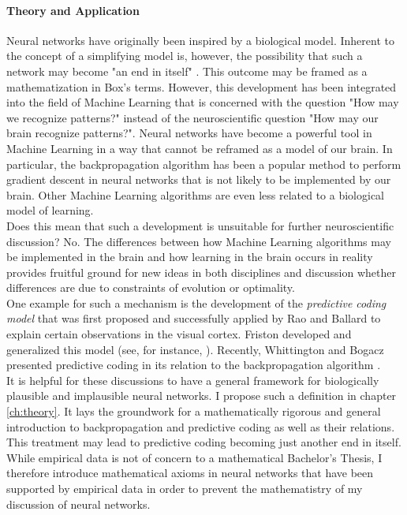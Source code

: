 \documentclass[a4paper,11pt]{report}
\begin{document}
\paragraph{Theory and Application}
Neural networks have originally been inspired by a biological model. Inherent to the concept of a simplifying model is, however, the possibility that such a network may become "an end in itself" \cite[][1305]{Sejnowski1988}. This outcome may be framed as a mathematization in Box's terms. However, this development has been integrated into the field of Machine Learning that is concerned with the question "How may we recognize patterns?" instead of the neuroscientific question "How may our brain recognize patterns?". Neural networks have become a powerful tool in Machine Learning in a way that cannot be reframed as a model of our brain. In particular, the backpropagation algorithm has been a popular method to perform gradient descent in neural networks that is not likely to be implemented by our brain. \cite{Liao2015} Other Machine Learning algorithms are even less related to a biological model of learning.\\
Does this mean that such a development is unsuitable for further neuroscientific discussion? No. The differences between how Machine Learning algorithms may be implemented in the brain and how learning in the brain occurs in reality provides fruitful ground for new ideas in both disciplines and discussion whether differences are due to constraints of evolution or optimality.\\
One example for such a mechanism is the development of the \emph{predictive coding model} that was first proposed and successfully applied by Rao and Ballard \cite{Rao1999} to explain certain observations in the visual cortex. Friston developed and generalized this model (see, for instance, \cite{Friston2005}). Recently, Whittington and Bogacz presented predictive coding in its relation to the backpropagation algorithm \cite{Whittington2017}.\\
It is helpful for these discussions to have a general framework for biologically plausible and implausible neural networks. I propose such a definition in chapter \ref{ch:theory}. It lays the groundwork for a mathematically rigorous and general introduction to backpropagation and predictive coding as well as their relations. This treatment may lead to predictive coding becoming just another end in itself. While empirical data is not of concern to a mathematical Bachelor's Thesis, I therefore introduce mathematical axioms in neural networks that have been supported by empirical data in order to prevent the mathematistry of my discussion of neural networks.
\end{document}
